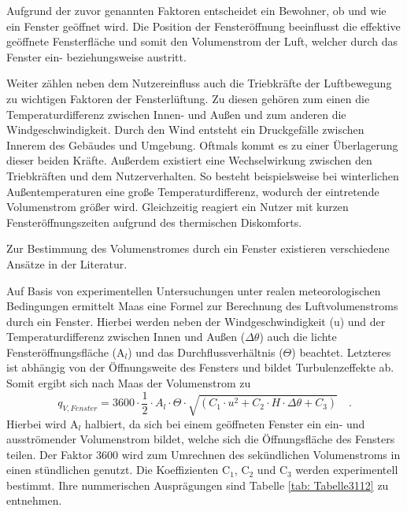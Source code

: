 Aufgrund der zuvor genannten Faktoren entscheidet ein Bewohner, ob und wie ein Fenster geöffnet wird.
Die Position der Fensteröffnung beeinflusst die effektive geöffnete Fensterfläche und somit den Volumenstrom der Luft, welcher durch das Fenster ein- beziehungsweise austritt.

Weiter zählen neben dem Nutzereinfluss auch die Triebkräfte der Luftbewegung zu wichtigen Faktoren der Fensterlüftung.
Zu diesen gehören zum einen die Temperaturdifferenz zwischen Innen- und Außen und zum anderen die Windgeschwindigkeit.
Durch den Wind entsteht ein Druckgefälle zwischen Innerem des Gebäudes und Umgebung.
Oftmals kommt es zu einer Überlagerung dieser beiden Kräfte.
Außerdem existiert eine Wechselwirkung zwischen den Triebkräften und dem Nutzerverhalten.
So besteht beispielsweise bei winterlichen Außentemperaturen eine große Temperaturdifferenz, wodurch der eintretende Volumenstrom größer wird.
Gleichzeitig reagiert ein Nutzer mit kurzen Fensteröffnungszeiten aufgrund des thermischen Diskomforts. \cite{Maas.2017}

Zur Bestimmung des Volumenstromes durch ein Fenster existieren verschiedene Ansätze in der Literatur.

Auf Basis von experimentellen Untersuchungen unter realen meteorologischen Bedingungen ermittelt Maas eine Formel zur Berechnung des Luftvolumenstroms durch ein Fenster.
Hierbei werden neben der Windgeschwindigkeit (u) und der Temperaturdifferenz zwischen Innen und Außen (\(\Delta \theta\)) auch die lichte Fensteröffnungsfläche (A\(_l\)) und das Durchflussverhältnis (\(\Theta\)) beachtet. 
Letzteres ist abhängig von der Öffnungsweite des Fensters und bildet Turbulenzeffekte ab.
Somit ergibt sich nach Maas der Volumenstrom zu
\begin{equation}
\label{eq:Gleichung3111}
q_{V, Fenster} = 3600 \cdot \frac{1}{2} \cdot A_l \cdot \Theta \cdot \sqrt{(C_1 \cdot u^2 + C_2 \cdot H \cdot \Delta \theta + C_3)} \quad \text{.}
\end{equation}
Hierbei wird A\(_l\) halbiert, da sich bei einem geöffneten Fenster ein ein- und ausströmender Volumenstrom bildet, welche sich die Öffnungsfläche des Fensters teilen.
Der Faktor 3600 wird zum Umrechnen des sekündlichen Volumenstroms in einen stündlichen genutzt.
Die Koeffizienten C\(_1\), C\(_2\) und C\(_3\) werden experimentell bestimmt.
Ihre nummerischen Ausprägungen sind Tabelle \ref{tab: Tabelle3112} zu entnehmen.

